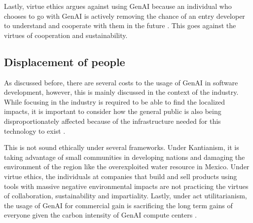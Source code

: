 Lastly, virtue ethics argues against using GenAI because an individual who chooses to go with GenAI is actively removing the chance of an entry developer to understand and cooperate with them in the future \cite{stack-overflow-junior-shortage}. This goes against the virtues of cooperation and sustainability.

\subsection{Displacement of people}
As discussed before, there are several costs to the usage of GenAI in software development, however, this is mainly discussed in the context of the industry. While focusing in the industry is required to be able to find the localized impacts, it is important to consider how the general public is also being disproportionately affected because of the infrastructure needed for this technology to exist \cite{people-displacement}.

This is not sound ethically under several frameworks. Under Kantianism, it is taking advantage of small communities in developing nations and damaging the environment of the region like the overexploited water resource in Mexico. Under virtue ethics, the individuals at companies that build and sell products using tools with massive negative environmental impacts are not practicing the virtues of collaboration, sustainability and impartiality. Lastly, under act utilitarianism, the usage of GenAI for commercial gain is sacrificing the long term gains of everyone given the carbon intensity of GenAI compute centers \cite{electricity-use}.
